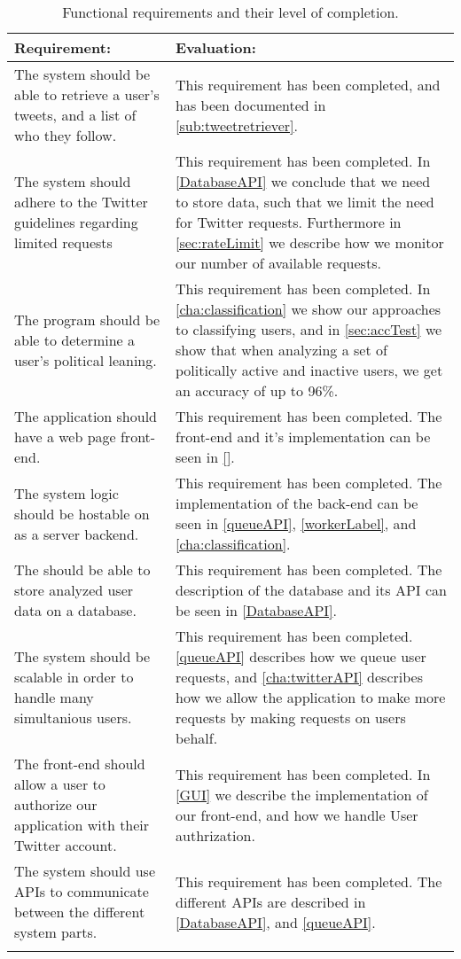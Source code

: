 \begin{longtable}{|p{6cm}|p{8cm}|}\hline 
\textbf{Requirement:}	&	\textbf{Evaluation:} \\\hline
The system should be able to retrieve a user's tweets, and a list of who they
follow.
&	This requirement has been completed, and has been documented in
\autoref{sub:tweetretriever}.\\\hline 
The system should adhere to the Twitter guidelines regarding limited requests
&	This requirement has been completed. In \autoref{DatabaseAPI} we
conclude that we need to store data, such that we limit the need for
Twitter requests. Furthermore in \autoref{sec:rateLimit} we describe how we
monitor our number of available requests. \\\hline
The program should be able to determine a user's political leaning.
&	This requirement has been completed. In \autoref{cha:classification} we
show our approaches to classifying users, and in \autoref{sec:accTest} we show
that when analyzing a set of politically active and inactive users, we get an
accuracy of up to 96\%.\\\hline
The application should have a web page front-end.
&	This requirement has been completed. The front-end and it's implementation can
be seen in \autoref{}. \\\hline
The system logic should be hostable on as a server backend.
& This requirement has been completed. The implementation of the back-end can be
seen in \autoref{queueAPI}, \autoref{workerLabel}, and
\autoref{cha:classification}. \\\hline
The should be able to store analyzed user data on a database.
&	This requirement has been completed. The description of the database and its
API can be seen in \autoref{DatabaseAPI}. \\\hline
The system should be scalable in order to handle many simultanious users.
&	This requirement has been completed. \autoref{queueAPI} describes how we queue
user requests, and \autoref{cha:twitterAPI} describes how we allow the
application to make more requests by making requests on users behalf.\\\hline
The front-end should allow a user to authorize our application with their
Twitter account.
&	This requirement has been completed. In \autoref{GUI} we describe the
implementation of our front-end, and how we handle User authrization. \\\hline
The system should use APIs to communicate between the different system parts.
&	This requirement has been completed. The different APIs are described in
\autoref{DatabaseAPI}, and \autoref{queueAPI}.\\\hline
\caption{Functional requirements and their level of completion.}
\label{table:concFuncReq}
\end{longtable}

